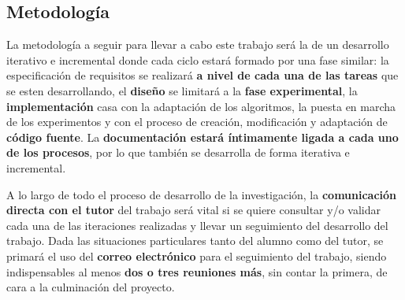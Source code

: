 \begin{table}[H]
	\centering
	\caption{Presupuesto estimado del trabajo}
	\label{tabla:Presupuesto}
\end{table}

\subsection{Metodología}

La metodología a seguir para llevar a cabo este trabajo será la de un desarrollo iterativo e incremental donde cada ciclo estará formado por una fase similar: la especificación de requisitos se realizará \textbf{a nivel de cada una de las tareas} que se esten desarrollando, el \textbf{diseño} se limitará a la \textbf{fase experimental}, la \textbf{implementación} casa con la adaptación de los algoritmos, la puesta en marcha de los experimentos y con el proceso de creación, modificación y adaptación de \textbf{código fuente}. La \textbf{documentación estará íntimamente ligada a cada uno de los procesos}, por lo que también se desarrolla de forma iterativa e incremental.

A lo largo de todo el proceso de desarrollo de la investigación, la \textbf{comunicación directa con el tutor} del trabajo será vital si se quiere consultar y/o validar cada una de las iteraciones realizadas y llevar un seguimiento del desarrollo del trabajo. Dada las situaciones particulares tanto del alumno como del tutor, se primará el uso del \textbf{correo electrónico} para el seguimiento del trabajo, siendo indispensables al menos \textbf{dos o tres reuniones más}, sin contar la primera, de cara a la culminación del proyecto.

